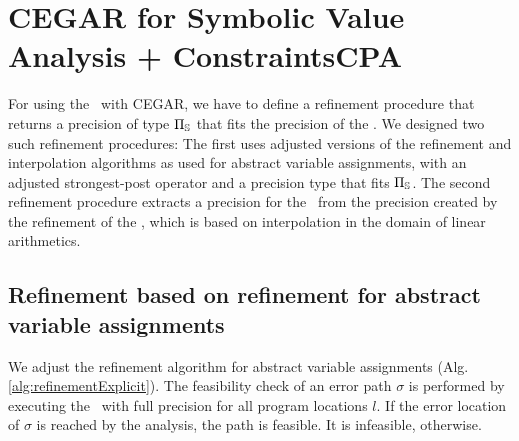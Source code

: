 \section{CEGAR for Symbolic Value Analysis + ConstraintsCPA}
For using the \symbolicExecutionCPA\ with CEGAR, we have to define a refinement procedure that returns a precision of type $\Pi_{\mathbb{S}}$ that fits the precision of the \symbolicExecutionCPA. We designed two such refinement procedures:
The first uses adjusted versions of the refinement and interpolation algorithms as used for abstract variable assignments,
with an adjusted strongest-post operator and a precision type that fits $\Pi_{\mathbb{S}}$.
The second refinement procedure extracts a precision for the \symbolicExecutionCPA\ from the precision created by the refinement of the \predicateCPA, which is based on interpolation in the domain of linear arithmetics.

\subsection{Refinement based on refinement for abstract variable assignments}
\label{sec:assignmentRefinement}
We adjust the refinement algorithm for abstract variable assignments (Alg. \ref{alg:refinementExplicit}).
The feasibility check of an error path $\sigma$ is performed by executing the \symbolicExecutionCPA\ with full precision for all program locations $l$.
If the error location of $\sigma$ is reached by the analysis, the path is feasible. It is infeasible, otherwise.

